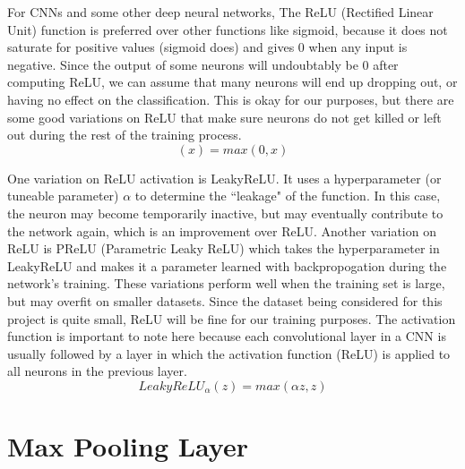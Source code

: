 \documentclass[12pt]{report} %
\begin{document}
	For CNNs and some other deep neural networks, The ReLU (Rectified Linear Unit) function is preferred over other functions like sigmoid, because it does not saturate for positive values (sigmoid does) and gives 0 when any input is negative. Since the output of some neurons will undoubtably be 0 after computing ReLU, we can assume that many neurons will end up dropping out, or having no effect on the classification. This is okay for our purposes, but there are some good variations on ReLU that make sure neurons do not get killed or left out during the rest of the training process\cite{aurelienMachineLearning}.
 \begin{equation}	
 (x) = max(0, x)%
 \end{equation}
 
	One variation on ReLU activation is LeakyReLU. It uses a hyperparameter (or tuneable parameter) \( \alpha \) to determine the ``leakage" of the function. In this case, the neuron may become temporarily inactive, but may eventually contribute to the network again, which is an improvement over ReLU. Another variation on ReLU is PReLU (Parametric Leaky ReLU) which takes the hyperparameter in LeakyReLU and makes it a parameter learned with backpropogation during the network's training. These variations perform well when the training set is large, but may overfit on smaller datasets. Since the dataset being considered for this project is quite small, ReLU will be fine for our training purposes. The activation function is important to note here because each convolutional layer in a CNN is usually followed by a layer in which the activation function (ReLU) is applied to all neurons in the previous layer.\cite{aurelienMachineLearning} 
 \begin{equation}
LeakyReLU_\alpha(z) = max(\alpha z, z)
  \end{equation} 
  
 \section{Max Pooling Layer}
\end{document}
